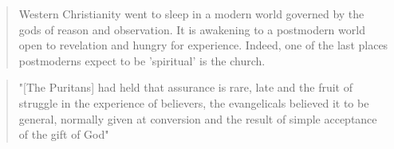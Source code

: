 \begin{quote}
  Western Christianity went to sleep in a modern world governed by the gods of reason and observation. It is awakening to a postmodern world open to revelation and hungry for experience. Indeed, one of the last places postmoderns expect to be 'spiritual' is the church.
\end{quote}

\begin{quote}
  "[The Puritans] had held that assurance is rare, late and the fruit of struggle in the experience of believers, the evangelicals believed it to be general, normally given at conversion and the result of simple acceptance of the gift of God"
\end{quote}
